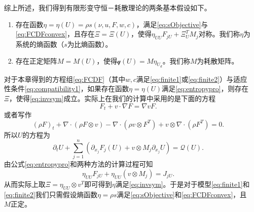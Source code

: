 综上所述，我们得到有限形变守恒－耗散理论的两条基本假设如下。
\begin{enumerate}
		\item 存在函数$\eta = \eta (U) = \rho s(\nu,u,F,w,c)$，满足\eqref{eq:sObjective}与\eqref{eq:FCDFconvex}，且存在$\Xi=\Xi(U)$，使得$\eta_{UU} F_{jU} + \Xi_U^T M_j $对称。我们称$\eta$为系统的熵函数（$s$为比熵函数）。
		\item 存在正定矩阵$M = M(U)$，使得$\mathcal{q}(U) = M \eta_{U_d}$。我们称$M$为耗散矩阵。
\end{enumerate}

对于本章得到的方程组\eqref{eq:FCDF}（其中$w,c$满足\eqref{eq:finite1}或\eqref{eq:finite2}）与适应性条件\eqref{eq:compatibility1}，如果存在函数$\eta = \eta(U)$满足\eqref{eq:entropypro}，则存在$\Xi$，使得\eqref{eq:invsym}成立。实际上在我们的计算中采用的是下面的方程
\begin{equation*}
	F_t + v  \cdot \nabla F = \nabla v F.
\end{equation*}
或者写作
\begin{equation*}
(\rho F)_t + \nabla \cdot (\rho F \otimes v) - \nabla \cdot (\rho v \otimes F^T) + v \otimes \nabla \cdot (\rho F^T) = 0 .
\end{equation*}
所以$U$的方程为
\begin{equation*}
	\partial_t U + \sum_{j=1}^n (\partial_{x_j} F_j(U) + v\otimes M_j \partial_{x_j} U)= \mathcal{Q} (U) .
\end{equation*}
由公式\eqref{eq:entropypro}和两种方法的计算过程可知
\begin{equation*}
	\eta_{UU} F_{jU} + \eta_{UU} (v \otimes M_{j}) = J_{jU}.
\end{equation*}
从而实际上取$\Xi = \eta_{UU} \otimes v^T$即可得到$\eta$满足\eqref{eq:invsym}。于是对于模型\eqref{eq:finite1}和\eqref{eq:finite2}我们只需假设熵函数$\eta = \rho s$满足\eqref{eq:sObjective}和\eqref{eq:FCDFconvex}，且$M$正定。

